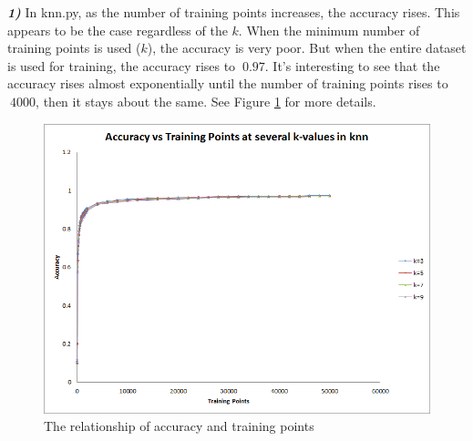 \documentclass[10pt,letterpaper]{article}
\begin{document}


\textbf{\textit{1)}}
In knn.py, as the number of training points increases, the accuracy rises.  This appears to be the case regardless of the $k$.  When the minimum number of training points is used ($k$), the accuracy is very poor.  But when the entire dataset is used for training, the accuracy rises to $~0.97$.  It's interesting to see that the accuracy rises almost exponentially until the number of training points rises to $~ 4000$, then it stays about the same.  See Figure \ref{fig:accuracyVsTrainingPoints} for more details.\\
\begin{figure}[h]
  \centering
  \includegraphics[scale=.4]{accuracyVsTrainingPoints}
  \caption{The relationship of accuracy and training points}
  \label{fig:accuracyVsTrainingPoints}
\end{figure}
\end{document}
